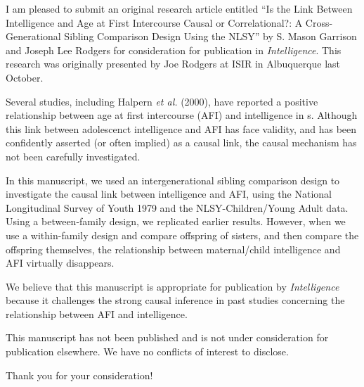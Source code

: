 \documentclass[10pt,stdletter,dateno,sigleft]{newlfm} %
\newcommand{\Title}{``Is the Link Between Intelligence and Age at First Intercourse Causal or Correlational?: A Cross-Generational Sibling Comparison Design Using the NLSY''\xspace}
\newcommand{\Authors}{S. Mason Garrison and Joseph Lee Rodgers\xspace}
\newcommand{\Journal}{\textit{Intelligence}\xspace}
\newcommand{\Presented}{This research was originally presented by Joe Rodgers at ISIR in Albuquerque last October}
\newcommand{\Goal}{Several studies, including Halpern \textit{et al.} (2000), have reported a positive relationship between age at first intercourse (AFI) and intelligence in s. Although this link between adolescenct intelligence and AFI has face validity, and has been confidently asserted (or often implied) as a causal link, the causal mechanism has not been carefully investigated}
\newcommand{\Findings}{we used an intergenerational sibling comparison design to investigate the causal link between intelligence and AFI, using the National Longitudinal Survey of Youth 1979 and the NLSY-Children/Young Adult data. Using a between-family design, we replicated earlier results. However, when we use a within-family design and compare offspring of sisters, and then compare the offspring themselves, the relationship between maternal/child intelligence and AFI virtually disappears}%
\newcommand{\Scope}{challenges the strong causal inference in past studies concerning the relationship between AFI and intelligence}%
\begin{document}
\begin{newlfm}


I am pleased to submit an original research article entitled \Title by \Authors for consideration for publication in \Journal. \Presented.

\Goal.

In this manuscript, \Findings.

We believe that this manuscript is appropriate for publication by \Journal because it \Scope .

This manuscript has not been published and is not under consideration for publication elsewhere. We have no conflicts of interest to disclose.

Thank you for your consideration!


\end{newlfm}
\end{document}
